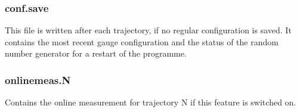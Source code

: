 \subsubsection*{\ttfamily conf.save}
This file is written after each trajectory, if no regular
configuration is saved. It contains the most recent gauge
configuration and the status of the random number generator for a
restart of the programme. 

\subsubsection*{\ttfamily onlinemeas.N}
Contains the online measurement for trajectory {\ttfamily N} if this
feature is switched on.

